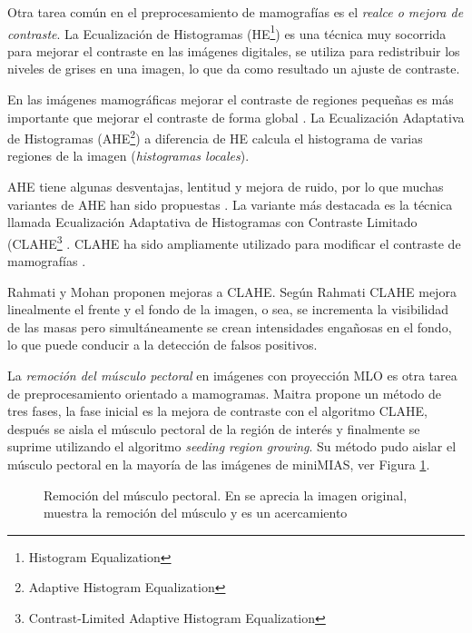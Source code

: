 Otra tarea común en el preprocesamiento de mamografías es el \textit{realce o
mejora de contraste}. La Ecualización de Histogramas (HE\footnote{Histogram
Equalization}) es una técnica muy socorrida para mejorar el contraste en las
imágenes digitales, se utiliza para redistribuir los niveles de grises en una
imagen, lo que da como resultado un ajuste de contraste.

En las imágenes mamográficas mejorar el contraste de regiones pequeñas es más
importante que mejorar el contraste de forma global \cite{mohan2013modified}.
La Ecualización Adaptativa de Histogramas (AHE\footnote{Adaptive Histogram
Equalization}) a diferencia de HE calcula el histograma de varias regiones de
la imagen (\textit{histogramas locales}).

AHE tiene algunas desventajas, lentitud y mejora de ruido, por lo que muchas
variantes de AHE han sido propuestas \cite{pizer1987adaptive}. La variante más
destacada es la técnica llamada Ecualización Adaptativa de Histogramas con
Contraste Limitado (CLAHE\footnote{Contrast-Limited Adaptive Histogram
Equalization} \cite{zuiderveld1994contrast}. CLAHE ha sido ampliamente
utilizado para modificar el contraste de mamografías \cite{pisano1998contrast,
maitra2012technique}.

Rahmati \cite{rahmati2010new} y Mohan \cite{mohan2013modified} proponen mejoras
a CLAHE. Según Rahmati CLAHE mejora linealmente el frente y el fondo de la
imagen, o sea, se incrementa la visibilidad de las masas pero simultáneamente
se crean intensidades engañosas en el fondo, lo que puede conducir a la
detección de falsos positivos.

La \textit{remoción del músculo pectoral} en imágenes con proyección MLO es
otra tarea de preprocesamiento orientado a mamogramas. Maitra propone un método
de tres fases, la fase inicial es la mejora de contraste con el algoritmo
CLAHE, después se aisla el músculo pectoral de la región de interés y
finalmente se suprime utilizando el algoritmo \textit{seeding region growing}.
Su método pudo aislar el músculo pectoral en la mayoría de las imágenes de
miniMIAS, ver Figura \ref{fig:muscle}.

\begin{figure}[h]
    \centering
    \hspace{1cm}
    \hspace{1cm}
  \caption[Remoción del músculo pectoral]
  {Remoción del músculo pectoral. En \protect{} se aprecia la 
  imagen original, \protect{} muestra la remoción del músculo y 
  \protect{} es un acercamiento}
  \label{fig:muscle}
\end{figure}

